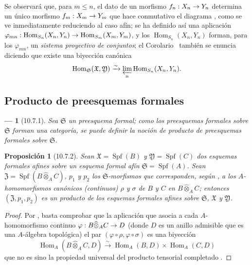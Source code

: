 \documentclass[oneside]{amsart}
\theoremstyle{ega-env-style}
\newtheorem*{env}{---}
\theoremstyle{ega-thm-env-style}
\newtheorem*{proposition}{Proposición}
\theoremstyle{ega-defn-env-style}
\def\leq{\leqslant}                 %
\renewcommand{\to}{\mathchoice{\longrightarrow}{\rightarrow}{\rightarrow}{\rightarrow}}
\let\EGAOriginalLabel\label
\renewcommand{\label}[1]{\phantomsection\EGAOriginalLabel{#1}}
\begin{document}
Se observará que, para $m\leq n$, el dato de un morfismo $f_n:X_n\to Y_n$ determina un único morfismo $f_m:X_m\to Y_m$ que hace conmutativo el diagrama , como se ve inmediatamente reduciendo al caso afín; se ha definido así una aplicación $\varphi_{mn}:\operatorname{Hom}_{S_n}(X_n,Y_n)
\to\operatorname{Hom}_{S_m}(X_m,Y_m)$, y los $\operatorname{Hom}_{S_n}(X_n,Y_n)$ forman, para los $\varphi_{mn}$, un \emph{sistema proyectivo de conjuntos}; el Corolario~ también se enuncia diciendo que existe una biyección canónica
\[
  \operatorname{Hom}_{\mathfrak{S}}(\mathfrak{X},\mathfrak{Y})
  \xrightarrow{\sim}
  \varprojlim_n\operatorname{Hom}_{S_n}(X_n,Y_n).
\]

\subsection{Producto de preesquemas formales}
\label{subsection:I.10.7}

\begin{env}[10.7.1]
\label{I.10.7.1}
Sea $\mathfrak{S}$ un preesquema formal; como los preesquemas formales sobre $\mathfrak{S}$ forman una categoría, se puede definir la noción de \emph{producto} de preesquemas formales sobre $\mathfrak{S}$.
\end{env}

\begin{proposition}[10.7.2]
\label{I.10.7.2}
Sean $\mathfrak{X}=\operatorname{Spf}(B)$ y $\mathfrak{Y}=\operatorname{Spf}(C)$ dos esquemas formales afines sobre un esquema formal afín $\mathfrak{S}=\operatorname{Spf}(A)$.
Sean $\mathfrak{Z}=\operatorname{Spf}(B\widehat{\otimes}_A C)$, $p_1$ y $p_2$ los $\mathfrak{S}$-morfismos que corresponden, según , a los $A$-homomorfismos canónicos (continuos) $\rho$ y $\sigma$ de $B$ y $C$ en $B\widehat{\otimes}_A C$; entonces $(\mathfrak{Z},p_1,p_2)$ es un producto de los esquemas formales afines sobre $\mathfrak{S}$, $\mathfrak{X}$ y $\mathfrak{Y}$.
\end{proposition}

\begin{proof}
Por , basta comprobar que la aplicación que asocia a cada $A$-homomorfismo continuo $\varphi:B\widehat{\otimes}_A C\to D$ (donde $D$ es un anillo admisible que es una $A$-álgebra topológica) el par $(\varphi\circ\rho,\varphi\circ\sigma)$ es una biyección
\[
  \operatorname{Hom}_A(B\widehat{\otimes}_A C,D)
  \xrightarrow{\sim}
  \operatorname{Hom}_A(B,D)\times\operatorname{Hom}_A(C,D)
\]
que no es sino la propiedad universal del producto tensorial completado .
\end{proof}
\end{document}
